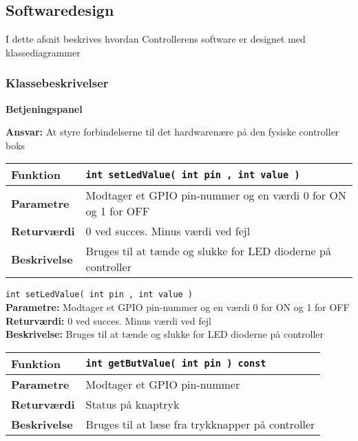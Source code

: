 \subsection{Softwaredesign}

I dette afsnit beskrives hvordan Controllerens software er designet med klassediagrammer

\subsubsection*{Klassebeskrivelser}


{\centering
\textbf{Betjeningspanel}\par
}
\textbf{Ansvar:} At styre forbindelserne til det hardwarenære på den fysiske controller boks \

\begin{center}
    \begin{tabular}{ | l | p{} |}
    \hline
    \textbf{Funktion}	& \verb+int setLedValue( int pin , int value ) +						\\ \hline
    \textbf{Parametre} 	& Modtager et GPIO pin-nummer og en værdi 0 for ON og 1 for OFF		\\ \hline
    \textbf{Returværdi}	& 0 ved succes. Minus værdi ved fejl 								\\ \hline
    \textbf{Beskrivelse}	& Bruges til at tænde og slukke for LED dioderne på controller		\\ \hline
    \end{tabular}
\end{center}


\verb+int setLedValue( int pin , int value ) +\\
\textbf{Parametre:}   Modtager et GPIO pin-nummer og en værdi 0 for ON og 1 for OFF \\
\textbf{Returværdi:}  0 ved succes. Minus værdi ved fejl \\
\textbf{Beskrivelse:} Bruges til at tænde og slukke for LED dioderne på controller \\

\begin{center}
    \begin{tabular}{ | l | p{} |}
    \hline
    \textbf{Funktion}	& \verb+int getButValue( int pin ) const +						\\ \hline
    \textbf{Parametre} 	& Modtager et GPIO pin-nummer									\\ \hline
    \textbf{Returværdi}	& Status på knaptryk 											\\ \hline
    \textbf{Beskrivelse}	& Bruges til at læse fra trykknapper på controller				\\ \hline
    \end{tabular}
\end{center}

